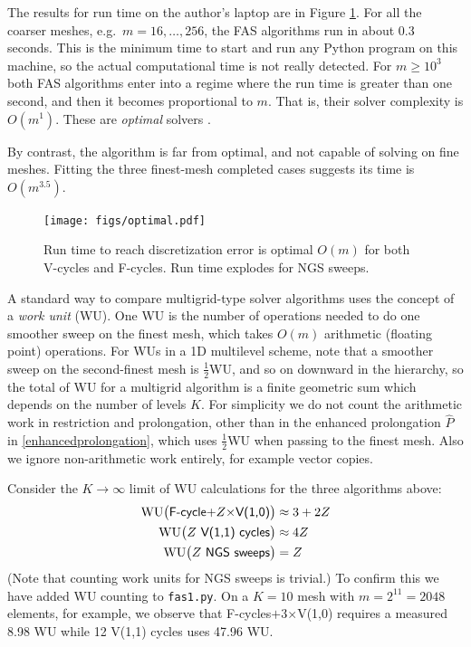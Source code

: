 \documentclass[letterpaper,final,12pt,reqno]{amsart}
\begin{document}
The results for run time on the author's laptop are in Figure \ref{fig:optimal}.  For all the coarser meshes, e.g.~$m=16,\dots,256$, the FAS algorithms run in about 0.3 seconds.  This is the minimum time to start and run any Python program on this machine, so the actual computational time is not really detected.  For $m \ge 10^3$ both FAS algorithms enter into a regime where the run time is greater than one second, and then it becomes proportional to $m$.  That is, their solver complexity is $O(m^1)$.  These are \emph{optimal} solvers \cite[Chapter 7]{Bueler2021}.

By contrast, the  algorithm is far from optimal, and not capable of solving on fine meshes.  Fitting the three finest-mesh completed cases suggests its time is $O(m^{3.5})$.

\begin{figure}
\texttt{[image: figs/optimal.pdf]}
\caption{Run time to reach discretization error is optimal $O(m)$ for both V-cycles and F-cycles.  Run time explodes for NGS sweeps.}
\label{fig:optimal}
\end{figure}

A standard way to compare multigrid-type solver algorithms uses the concept of a \emph{work unit} (WU).  One WU is the number of operations needed to do one smoother sweep on the finest mesh, which takes $O(m)$ arithmetic (floating point) operations.  For WUs in a 1D multilevel scheme, note that a smoother sweep on the second-finest mesh is $\frac{1}{2}$WU, and so on downward in the hierarchy, so the total of WU for a multigrid algorithm is a finite geometric sum \cite{Briggsetal2000} which depends on the number of levels $K$.  For simplicity we do not count the arithmetic work in restriction and prolongation, other than in the enhanced prolongation $\hat P$ in \eqref{enhancedprolongation}, which uses $\frac{1}{2}$WU when passing to the finest mesh.  Also we ignore non-arithmetic work entirely, for example vector copies.

Consider the $K\to\infty$ limit of WU calculations for the three algorithms above:
\begin{align*}
\text{WU}\big(\text{\textsf{F-cycle$+Z\times$V(1,0)}}\big) &\approx 3+2Z \\
\text{WU}\big(\text{\textsf{$Z$ V(1,1) cycles}}\big)   &\approx 4Z \\
\text{WU}\big(\text{\textsf{$Z$ NGS sweeps}}\big)      &= Z
\end{align*}
(Note that counting work units for NGS sweeps is trivial.)  To confirm this we have added WU counting to \texttt{fas1.py}.  On a $K=10$ mesh with $m=2^{11}=2048$ elements, for example, we observe that \textsf{F-cycles$+$3$\times$V(1,0)} requires a measured 8.98 WU while \textsf{12 V(1,1) cycles} uses 47.96 WU.
\end{document}
